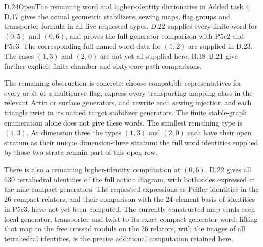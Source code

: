 \begin{result}{D.24}{Open}{The remaining word and higher-identity dictionaries in Added task 4}
D.17 gives the actual geometric stabilizers, sewing maps,
flag groups and transporter formula in all five requested
types.  D.22 supplies every finite word for $(0,5)$ and
$(0,6)$, and proves the full generator comparison with
P5c2 and P5c3.  The corresponding full named word data
for $(1,2)$ are supplied in D.23.  The cases $(1,3)$ and
$(2,0)$ are not yet all supplied here.
B.18--B.21 give further explicit
finite chamber and sixty-core-path comparisons.

The remaining obstruction is concrete: choose compatible
representatives for every orbit of a multicurve flag,
express every transporting mapping class in the relevant
Artin or surface generators, and rewrite each sewing
injection and each triangle twist in its named target
stabilizer generators.  The finite stable-graph enumeration
alone does not give these words.  The smallest remaining
type is $(1,3)$.  At dimension three the types $(1,3)$
and $(2,0)$ each have their open stratum as their unique
dimension-three stratum; the full word identities supplied
by those two strata remain part of this open row.

There is also a remaining higher-identity computation at $(0,6)$.
D.22 gives all $630$ tetrahedral identities of the full action
diagram, with both sides expressed in the nine compact generators.
The requested expressions as Peiffer identities in the $26$
compact relators, and their comparison with the $24$-element
basis of identities in P5c3, have not yet been computed.
The currently constructed map sends each local generator,
transporter and twist to its exact compact-generator word;
lifting that map to the free crossed module on the $26$
relators, with the images of all tetrahedral identities,
is the precise additional computation retained here.
\end{result}
